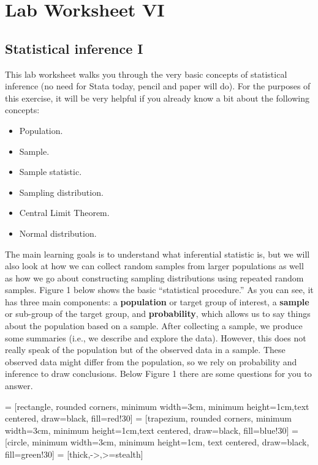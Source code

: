 \documentclass{article}
\begin{document}
\pagestyle{fancy}
\fancyhf{}

\section*{\hfil Lab Worksheet VI \hfil}
\subsection*{Statistical inference I}

This lab worksheet walks you through the very basic concepts of statistical inference (no need for Stata today, pencil and paper will do). For the purposes of this exercise, it will be very helpful if you already know a bit about the following concepts:

\begin{itemize}
	\item Population.
	\item Sample.
	\item Sample statistic.
	\item Sampling distribution.
	\item Central Limit Theorem.
	\item Normal distribution.
\end{itemize}

The main learning goals is to understand what inferential statistic is, but we will also look at how we can collect random samples from larger populations as well as how we go about constructing sampling distributions using repeated random samples. Figure 1 below shows the basic ``statistical procedure.'' As you can see, it has three main components: a \textbf{population} or target group of interest, a \textbf{sample} or sub-group of the target group, and \textbf{probability}, which allows us to say things about the population based on a sample. After collecting a sample, we produce some summaries (i.e., we describe and explore the data). However, this does not really speak of the population but of the observed data in a sample. These observed data might differ from the population, so we rely on probability and inference to draw conclusions. Below Figure 1 there are some questions for you to answer. 

 = [rectangle, rounded corners, minimum width=3cm, minimum height=1cm,text centered, draw=black, fill=red!30]
 = [trapezium, rounded corners, minimum width=3cm, minimum height=1cm,text centered, draw=black, fill=blue!30]
 = [circle, minimum width=3cm, minimum height=1cm, text centered, draw=black, fill=green!30]
 = [thick,->,>=stealth]
\end{document}

